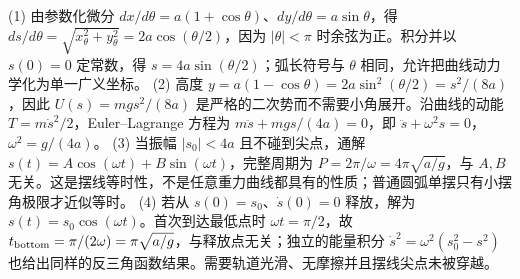 (1) 由参数化微分 \(dx/d\theta=a(1+\cos\theta)\)、\(dy/d\theta=a\sin\theta\)，得 \(ds/d\theta=\sqrt{x_\theta^2+y_\theta^2}=2a\cos(\theta/2)\)，因为 \(|\theta|<\pi\) 时余弦为正。积分并以 \(s(0)=0\) 定常数，得 \(s=4a\sin(\theta/2)\)；弧长符号与 \(\theta\) 相同，允许把曲线动力学化为单一广义坐标。
(2) 高度 \(y=a(1-\cos\theta)=2a\sin^2(\theta/2)=s^2/(8a)\)，因此 \(U(s)=mg s^2/(8a)\) 是严格的二次势而不需要小角展开。沿曲线的动能 \(T=m\dot s^2/2\)，Euler–Lagrange 方程为 \(m\ddot s+mg s/(4a)=0\)，即 \(\ddot s+\omega^2s=0\)，\(\omega^2=g/(4a)\)。
(3) 当振幅 \(|s_0|<4a\) 且不碰到尖点，通解 \(s(t)=A\cos(\omega t)+B\sin(\omega t)\)，完整周期为 \(P=2\pi/\omega=4\pi\sqrt{a/g}\)，与 \(A,B\) 无关。这是摆线等时性，不是任意重力曲线都具有的性质；普通圆弧单摆只有小摆角极限才近似等时。
(4) 若从 \(s(0)=s_0\)、\(\dot s(0)=0\) 释放，解为 \(s(t)=s_0\cos(\omega t)\)。首次到达最低点时 \(\omega t=\pi/2\)，故 \(t_{\rm bottom}=\pi/(2\omega)=\pi\sqrt{a/g}\)，与释放点无关；独立的能量积分 \(\dot s^2=\omega^2(s_0^2-s^2)\) 也给出同样的反三角函数结果。需要轨道光滑、无摩擦并且摆线尖点未被穿越。
